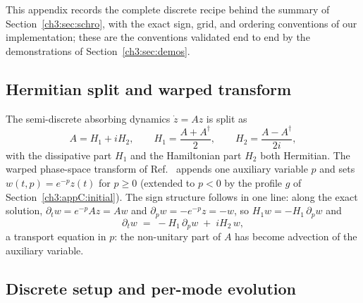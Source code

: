 \label{ch3:appC:schro}

This appendix records the complete discrete recipe behind the summary of
Section~\ref{ch3:sec:schro}, with the exact sign, grid, and ordering conventions
of our implementation; these are the conventions validated end to end by
the demonstrations of Section~\ref{ch3:sec:demos}.

\subsection{Hermitian split and warped transform}
\label{ch3:appC:transform}

The semi-discrete absorbing dynamics $\dot z = Az$ is split as
\begin{equation}
  A = H_1 + iH_2, \qquad
  H_1 = \frac{A + A^{\dagger}}{2}, \qquad
  H_2 = \frac{A - A^{\dagger}}{2i},
  \label{ch3:appC:split}
\end{equation}
with the dissipative part $H_1$ and the Hamiltonian part $H_2$ both
Hermitian.  The warped phase-space transform of
Ref.~\cite{jin2023schrodingerisation} appends one auxiliary variable $p$
and sets $w(t,p) = e^{-p}z(t)$ for $p\ge0$ (extended to $p<0$ by the
profile $g$ of Section~\ref{ch3:appC:initial}).  The sign structure follows in
one line: along the exact solution, $\partial_t w = e^{-p}Az = Aw$ and
$\partial_p w = -e^{-p}z = -w$, so $H_1 w = -H_1\,\partial_p w$ and
\begin{equation}
  \partial_t w \;=\; -H_1\,\partial_p w \;+\; iH_2\,w,
  \label{ch3:appC:warped}
\end{equation}
a transport equation in $p$: the non-unitary part of $A$ has become
advection of the auxiliary variable.

\subsection{Discrete setup and per-mode evolution}
\label{ch3:appC:discrete}


